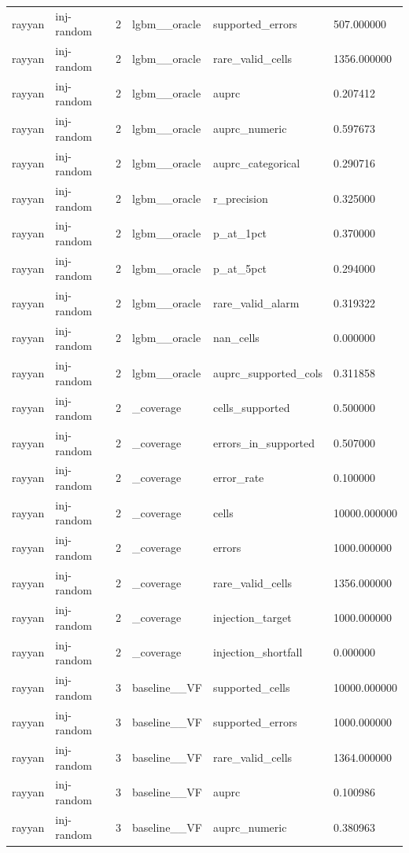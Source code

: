 \begin{tabular}{llllll}
rayyan & inj-random & 2 & lgbm\_\_oracle & supported\_errors & 507.000000 \\
rayyan & inj-random & 2 & lgbm\_\_oracle & rare\_valid\_cells & 1356.000000 \\
rayyan & inj-random & 2 & lgbm\_\_oracle & auprc & 0.207412 \\
rayyan & inj-random & 2 & lgbm\_\_oracle & auprc\_numeric & 0.597673 \\
rayyan & inj-random & 2 & lgbm\_\_oracle & auprc\_categorical & 0.290716 \\
rayyan & inj-random & 2 & lgbm\_\_oracle & r\_precision & 0.325000 \\
rayyan & inj-random & 2 & lgbm\_\_oracle & p\_at\_1pct & 0.370000 \\
rayyan & inj-random & 2 & lgbm\_\_oracle & p\_at\_5pct & 0.294000 \\
rayyan & inj-random & 2 & lgbm\_\_oracle & rare\_valid\_alarm & 0.319322 \\
rayyan & inj-random & 2 & lgbm\_\_oracle & nan\_cells & 0.000000 \\
rayyan & inj-random & 2 & lgbm\_\_oracle & auprc\_supported\_cols & 0.311858 \\
rayyan & inj-random & 2 & \_coverage & cells\_supported & 0.500000 \\
rayyan & inj-random & 2 & \_coverage & errors\_in\_supported & 0.507000 \\
rayyan & inj-random & 2 & \_coverage & error\_rate & 0.100000 \\
rayyan & inj-random & 2 & \_coverage & cells & 10000.000000 \\
rayyan & inj-random & 2 & \_coverage & errors & 1000.000000 \\
rayyan & inj-random & 2 & \_coverage & rare\_valid\_cells & 1356.000000 \\
rayyan & inj-random & 2 & \_coverage & injection\_target & 1000.000000 \\
rayyan & inj-random & 2 & \_coverage & injection\_shortfall & 0.000000 \\
rayyan & inj-random & 3 & baseline\_\_VF & supported\_cells & 10000.000000 \\
rayyan & inj-random & 3 & baseline\_\_VF & supported\_errors & 1000.000000 \\
rayyan & inj-random & 3 & baseline\_\_VF & rare\_valid\_cells & 1364.000000 \\
rayyan & inj-random & 3 & baseline\_\_VF & auprc & 0.100986 \\
rayyan & inj-random & 3 & baseline\_\_VF & auprc\_numeric & 0.380963 \\

\end{tabular}
